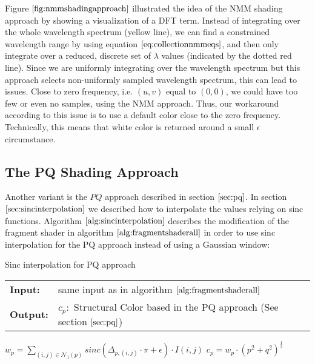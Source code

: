 Figure $\ref{fig:nmmshadingapproach}$ illustrated the idea of the NMM shading approach by showing a visualization of a DFT term. Instead of integrating over the whole wavelength spectrum (yellow line), we can find a constrained wavelength range by using equation $\ref{eq:collectionnmmeqs}$, and then only integrate over a reduced, discrete set of $\lambda$ values (indicated by the dotted red line). Since we are uniformly integrating over the wavelength spectrum but this approach selects non-uniformly sampled wavelength spectrum, this can lead to issues. Close to zero frequency, i.e. $(u,v)$ equal to $(0,0)$, we could have too few or even no samples, using the NMM approach. Thus, our workaround according to this issue is to use a default color close to the zero frequency. Technically, this means that white color is returned around a small $\epsilon$ circumstance.

\subsection{The PQ Shading Approach}
\label{sec:pqapproach}
Another variant is the $PQ$ approach described in section $\ref{sec:pq}$. In section $\ref{sec:sincinterpolation}$ we described how to interpolate the values relying on sinc functions. Algorithm $\ref{alg:sincinterpolation}$ describes the modification of the fragment shader in algorithm $\ref{alg:fragmentshaderall}$ in order to use sinc interpolation for the PQ approach instead of using a Gaussian window:

\begin{algorithm}[H]
\caption{Sinc interpolation for PQ approach}
\begin{table}[H]
  \begin{tabular}{@{}lll@{}}
    \textbf{Input:} & same input as in algorithm $\ref{alg:fragmentshaderall}$ \\
    \textbf{Output:} & $c_p:$ Structural Color based in the PQ approach (See section $\ref{sec:pq}$) \\
  \end{tabular} 
\end{table}
\setlength{\fboxrule}{0pt} 
\begin{boxedminipage}{1.0\textwidth}
  \begin{algorithmic}[1]
      \State $w_p = \sum_{(i,j) \in \mathcal{N}_{1}(p)} sinc(\Delta_{p,(i,j)} \cdot \pi + \epsilon) \cdot I(i,j)$
      \State $c_p = w_p \cdot (p^2 + q^2)^{\frac{1}{2}}$
    \EndFor
  \end{algorithmic}
  \end{boxedminipage}
  \vskip1.5pt
\label{alg:sincinterpolation}
\end{algorithm}

